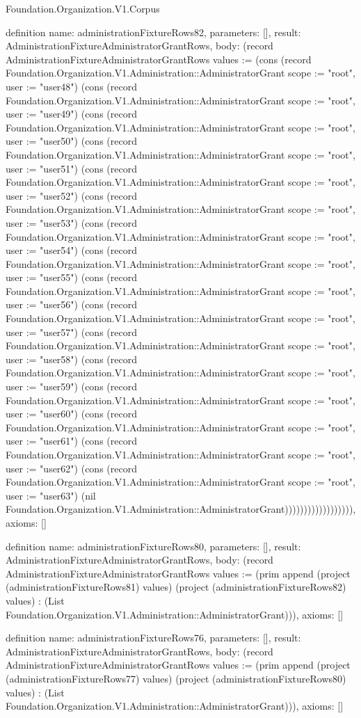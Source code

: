 \begin{lexlean}{Foundation.Organization.V1.Corpus}
\begin{semanticmodule}
definition{
  name: administrationFixtureRows82,
  parameters: [],
  result: AdministrationFixtureAdministratorGrantRows,
  body: (record AdministrationFixtureAdministratorGrantRows {values := (cons (record Foundation.Organization.V1.Administration::AdministratorGrant {scope := "root", user := "user48"}) (cons (record Foundation.Organization.V1.Administration::AdministratorGrant {scope := "root", user := "user49"}) (cons (record Foundation.Organization.V1.Administration::AdministratorGrant {scope := "root", user := "user50"}) (cons (record Foundation.Organization.V1.Administration::AdministratorGrant {scope := "root", user := "user51"}) (cons (record Foundation.Organization.V1.Administration::AdministratorGrant {scope := "root", user := "user52"}) (cons (record Foundation.Organization.V1.Administration::AdministratorGrant {scope := "root", user := "user53"}) (cons (record Foundation.Organization.V1.Administration::AdministratorGrant {scope := "root", user := "user54"}) (cons (record Foundation.Organization.V1.Administration::AdministratorGrant {scope := "root", user := "user55"}) (cons (record Foundation.Organization.V1.Administration::AdministratorGrant {scope := "root", user := "user56"}) (cons (record Foundation.Organization.V1.Administration::AdministratorGrant {scope := "root", user := "user57"}) (cons (record Foundation.Organization.V1.Administration::AdministratorGrant {scope := "root", user := "user58"}) (cons (record Foundation.Organization.V1.Administration::AdministratorGrant {scope := "root", user := "user59"}) (cons (record Foundation.Organization.V1.Administration::AdministratorGrant {scope := "root", user := "user60"}) (cons (record Foundation.Organization.V1.Administration::AdministratorGrant {scope := "root", user := "user61"}) (cons (record Foundation.Organization.V1.Administration::AdministratorGrant {scope := "root", user := "user62"}) (cons (record Foundation.Organization.V1.Administration::AdministratorGrant {scope := "root", user := "user63"}) (nil Foundation.Organization.V1.Administration::AdministratorGrant)))))))))))))))))}),
  axioms: []
}

definition{
  name: administrationFixtureRows80,
  parameters: [],
  result: AdministrationFixtureAdministratorGrantRows,
  body: (record AdministrationFixtureAdministratorGrantRows {values := (prim append (project (administrationFixtureRows81) values) (project (administrationFixtureRows82) values) : (List Foundation.Organization.V1.Administration::AdministratorGrant))}),
  axioms: []
}

definition{
  name: administrationFixtureRows76,
  parameters: [],
  result: AdministrationFixtureAdministratorGrantRows,
  body: (record AdministrationFixtureAdministratorGrantRows {values := (prim append (project (administrationFixtureRows77) values) (project (administrationFixtureRows80) values) : (List Foundation.Organization.V1.Administration::AdministratorGrant))}),
  axioms: []
}


\end{semanticmodule}
\end{lexlean}
